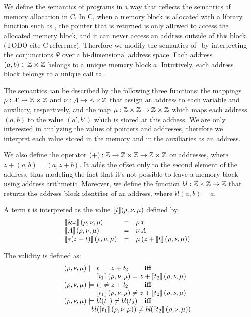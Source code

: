 We define the semantics of programs in a way that reflects the semantics of memory allocation in C.
In C, when a memory block is allocated with a library function such as \malloc, the pointer that is returned is only allowed to access the allocated memory block, and it can never access an address outside of this block.
(TODO cite C reference).
Therefore we modify the semantics of~\cite{2pointer} by interpreting the conjunctions $\Psi$ over a bi-dimensional address space.
Each address $(a, b) \in \mathbb{Z} \times \mathbb{Z}$ belongs to a unique memory block $a$.
Intuitively, each address block belongs to a unique call to \malloc.

The semantics can be described by the following three functions: the mappings $\rho : \mathcal{X} \rightarrow \mathbb{Z} \times \mathbb{Z}$ and $\nu : \mathcal{A} \rightarrow \mathbb{Z} \times \mathbb{Z}$ that assign an address to each variable and auxiliary, respectively, and the map $\mu : \mathbb{Z} \times \mathbb{Z} \rightarrow \mathbb{Z} \times \mathbb{Z}$ which maps each address $(a, b)$ to the value $(a', b')$ which is stored at this address.
We are only interested in analyzing the values of pointers and addresses, therefore we interpret each value stored in the memory and in the auxiliaries as an address.

We also define the operator $(+) : \mathbb{Z} \rightarrow \mathbb{Z} \times \mathbb{Z} \rightarrow \mathbb{Z} \times \mathbb{Z}$ on addresses, where $z + (a,b) = (a, z+b)$.
It adds the offset only to the second element of the address, thus modeling the fact that it's not possible to leave a memory block using address arithmetic.
Moreover, we define the function $bl : \mathbb{Z} \times \mathbb{Z} \rightarrow \mathbb{Z}$ that returns the address block identifier of an address, where $bl(a,b) = a$.

A term $t$ is interpreted as the value $\llbracket t\rrbracket(\rho, \nu, \mu)$ defined by:
\[
  \begin{array}{lll}
    \llbracket\& x\rrbracket\,(\rho,\nu,\mu)   & = & \rho\,x                          \\
    \llbracket A\rrbracket\,(\rho,\nu,\mu)      & = & \nu\,A                           \\
    \llbracket*(z+t)\rrbracket\,(\rho,\nu,\mu) & = & \mu\,(z+\llbracket t\rrbracket\,(\rho,\nu,\mu)) \\
  \end{array}
\]

The validity is defined as:
\[
  \begin{array}{ll}
    (\rho,\nu,\mu)\models t_1 = z+t_2          & \textbf{iff}
    \\ \multicolumn{2}{c}{\quad\quad\quad\quad\sem{t_1}\,(\rho,\nu,\mu) = z+\sem{t_2}\,(\rho,\nu,\mu)}	\\
    (\rho,\nu,\mu)\models t_1 \neq z+t_2       & \textbf{iff}
    \\ \multicolumn{2}{c}{\quad\quad\quad\quad\sem{t_1}\,(\rho,\nu,\mu) \neq z+\sem{t_2}\,(\rho,\nu,\mu)}	\\
    (\rho,\nu,\mu)\models bl(t_1) \neq bl(t_2) & \textbf{iff}
    \\ \multicolumn{2}{c}{\quad\quad\quad\quad bl(\sem{t_1}\,(\rho, \nu, \mu)) \neq bl(\sem{t_2}\,(\rho, \nu, \mu))}
  \end{array}
\]

